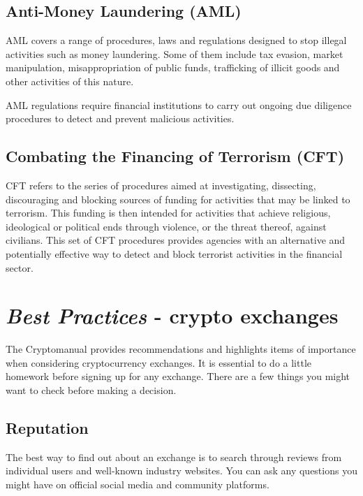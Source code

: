 \subsection{Anti-Money Laundering (AML)}
AML covers a range of procedures, laws and regulations designed to stop illegal activities such as money laundering. Some of them include tax evasion, market manipulation, misappropriation of public funds, trafficking of illicit goods and other activities of this nature.

AML regulations require financial institutions to carry out ongoing due diligence procedures to detect and prevent malicious activities.

\subsection{Combating the Financing of Terrorism (CFT)}
CFT refers to the series of procedures aimed at investigating, dissecting, discouraging and blocking sources of funding for activities that may be linked to terrorism. This funding is then intended for activities that achieve religious, ideological or political ends through violence, or the threat thereof, against civilians. This set of CFT procedures provides agencies with an alternative and potentially effective way to detect and block terrorist activities in the financial sector.


\newpage

\section{\emph{Best Practices} - crypto exchanges}
\label{sec:importantconsiderations}

The {\selectfont Cryptomanual}  provides recommendations and highlights items of importance when considering cryptocurrency exchanges. It is essential to do a little homework before signing up for any exchange. There are a few things you might want to check before making a decision.

\subsection*{Reputation} The best way to find out about an exchange is to search through reviews from individual users and well-known industry websites. You can ask any questions you might have on official social media and community platforms.

